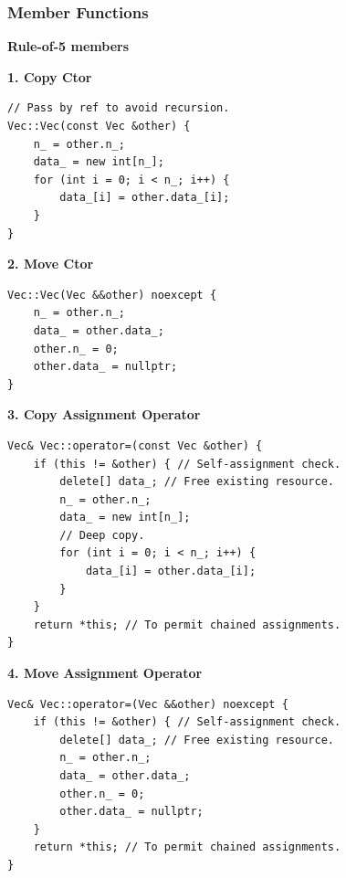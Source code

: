 \subsubsection{Member Functions}

\begin{center}
\textbf{Rule-of-5 members} 
\end{center}

\textbf{1. Copy Ctor}
\begin{mdframed}[nobreak=true,backgroundcolor=gray!10,linecolor=Firebrick4]
\begin{verbatim}
// Pass by ref to avoid recursion.
Vec::Vec(const Vec &other) { 
    n_ = other.n_;
    data_ = new int[n_];
    for (int i = 0; i < n_; i++) {
        data_[i] = other.data_[i];
    }
}    
\end{verbatim}
\end{mdframed}

\textbf{2. Move Ctor}

\begin{mdframed}[nobreak=true,backgroundcolor=gray!10,linecolor=Firebrick4]
\begin{verbatim}
Vec::Vec(Vec &&other) noexcept {
    n_ = other.n_;
    data_ = other.data_;
    other.n_ = 0;
    other.data_ = nullptr;    
}    
\end{verbatim}
\end{mdframed}

\vfill\null
\columnbreak


\textbf{3. Copy Assignment Operator}

\begin{mdframed}[nobreak=true,backgroundcolor=gray!10,linecolor=Firebrick4]
\begin{verbatim}
Vec& Vec::operator=(const Vec &other) {
    if (this != &other) { // Self-assignment check.
        delete[] data_; // Free existing resource.
        n_ = other.n_;
        data_ = new int[n_];
        // Deep copy.
        for (int i = 0; i < n_; i++) {
            data_[i] = other.data_[i];
        }
    }    
    return *this; // To permit chained assignments.
}
\end{verbatim}
\end{mdframed}


\textbf{4. Move Assignment Operator}

\begin{mdframed}[nobreak=true,backgroundcolor=gray!10,linecolor=Firebrick4]
\begin{verbatim}
Vec& Vec::operator=(Vec &&other) noexcept {
    if (this != &other) { // Self-assignment check.
        delete[] data_; // Free existing resource.
        n_ = other.n_;
        data_ = other.data_;
        other.n_ = 0;
        other.data_ = nullptr;    
    }    
    return *this; // To permit chained assignments.    
}
\end{verbatim}
\end{mdframed}

